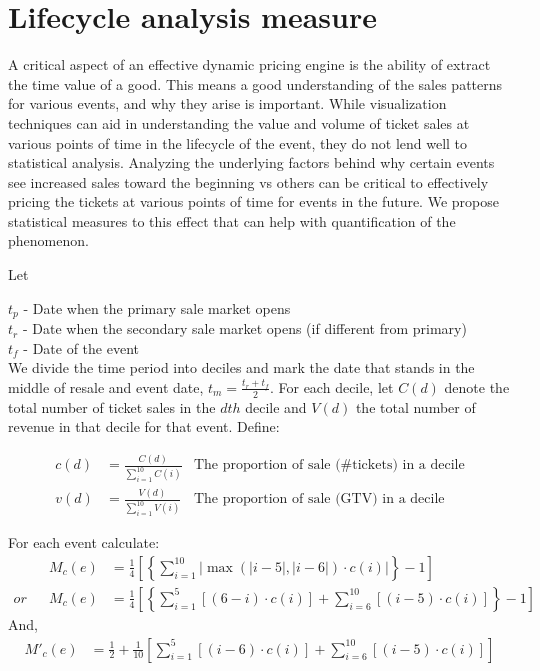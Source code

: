 \documentclass[letterpaper, 12pt]{article}
\begin{document}
\section{Lifecycle analysis measure}\label{lcm}
A critical aspect of an effective dynamic pricing engine is the ability of extract the time value of a good. This means a good understanding of the sales patterns for various events, and why they arise is important. While visualization techniques can aid in understanding the value and volume of ticket sales at various points of time in the lifecycle of the event, they do not lend well to statistical analysis. Analyzing the underlying factors behind why certain events see increased sales toward the beginning vs others can be critical to effectively pricing the tickets at various points of time for events in the future. We propose statistical measures to this effect that can help with quantification of the phenomenon.

\noindent Let

\noindent $t_p$ - Date when the primary sale market opens\\
$t_r$ - Date when the secondary sale market opens (if different from primary)\\
$t_f$ - Date of the event\\ 

We divide the time period into deciles and mark the date that stands in the middle of resale and event date, $t_m = \frac{t_r+t_f}{2}$. For each decile, let $C(d)$ denote the total number of ticket sales in the $dth$ decile and $V(d)$ the total number of revenue in that decile for that event. Define:

\begin{align*}
	c(d) &= \frac{C(d)}{\sum_{i=1}^{10}C(i)}&\text{The proportion of sale (\# tickets) in a decile}\\
	v(d) &= \frac{V(d)}{\sum_{i=1}^{10}V(i)}&\text{The proportion of sale (GTV) in a decile}
\end{align*}

\noindent For each event calculate:
\begin{align*}
	&&M_c(e) &= \frac{1}{4}\left[\left\{\sum_{i=1}^{10} \left| \max(|i-5|,|i-6|) \cdot c(i) \right|\right\} -1 \right]\\
	or&&M_c(e) &= \frac{1}{4}\left[\left\{\sum_{i=1}^{5} \left[ (6-i) \cdot c(i) \right] +\sum_{i=6}^{10} \left[ (i-5) \cdot c(i) \right]\right\} -1 \right]
\end{align*}
And, 
\begin{align*}
  M'_c(e) &= \frac{1}{2} + \frac{1}{10}\left[\sum_{i=1}^{5} \left[ (i-6) \cdot c(i) \right] +\sum_{i=6}^{10} \left[ (i-5) \cdot c(i) \right]\right]\\
\end{align*}
\end{document}
